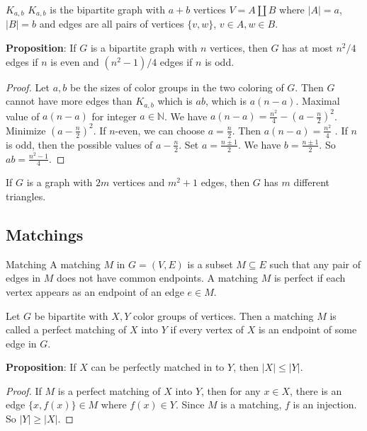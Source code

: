 \documentclass{report}
\begin{document}
\begin{definition}{$K_{a, b}$}
    $K_{a, b}$ is the bipartite graph with $a + b$ vertices $V = A \coprod B$ where $\lvert A \rvert = a$, $\lvert B \rvert = b$ and edges are all pairs of vertices $\{v, w\}$, $v \in A, w \in B$. 
\end{definition}

\textbf{Proposition}: If $G$ is a bipartite graph with $n$ vertices, then $G$ has at most $n^{2}/4$ edges if $n$ is even and $(n^{2} - 1)/4$ edges if $n$ is odd. 
    \begin{proof}
        Let $a, b$ be the sizes of color groups in the two coloring of $G$. Then $G$ cannot have more edges than $K_{a, b}$ which is $ab$, which is $a(n - a)$. Maximal value of $a(n - a)$ for integer $a \in \mathbb{N}$. We have $a(n - a) = \frac{n^{2}}{4} - (a -  \frac{n}{2})^{2}$. Minimize $(a - \frac{n}{2})^{2}$. If $n$-even, we can choose $a = \frac{n}{2}$. Then $a(n - a) = \frac{n^{2}}{4}$ . If $n$ is odd, then the possible values of $a - \frac{n}{2}$. Set $a = \frac{n \pm 1}{2}$. We have $b = \frac{n \pm 1}{2}$. So $ab = \frac{n^{2} - 1}{4}$.
    \end{proof}

\begin{theorem}{}
    If $G$ is a graph with $2m$ vertices and $m^{2} + 1$ edges, then $G$ has $m$ different triangles.
\end{theorem}

\begin{topic}
    \section{Matchings}
\end{topic}

\begin{definition}{Matching}
    A matching $M$ in $G = (V, E)$ is a subset $M \subseteq E$ such that any pair of edges in $M$ does not have common endpoints. A matching $M$ is perfect if each vertex appears as an endpoint of an edge $e \in M$.
\end{definition}

\begin{definition}{}
    Let $G$ be bipartite with $X, Y$ color groups of vertices. Then a matching $M$ is called a perfect matching of $X$ into $Y$ if every vertex of $X$ is an endpoint of some edge in $G$.
\end{definition}

\textbf{Proposition}: If $X$ can be perfectly matched in to $Y$, then $\lvert X \rvert \leq \lvert Y \rvert$. 
    \begin{proof}
        If $M$ is a perfect matching of $X$ into $Y$, then for any $x \in X$, there is an edge $\{x, f(x)\} \in M$ where $f(x) \in Y$. Since $M$ is a matching, $f$ is an injection. So $\lvert Y \rvert \geq \lvert X \rvert$.
    \end{proof}
\end{document}
